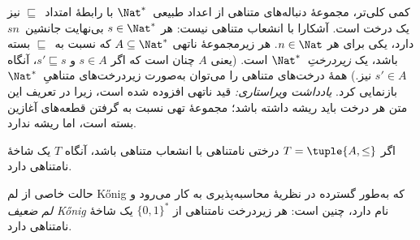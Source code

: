 \documentclass[../../../include/open-logic-section]{subfiles}
\begin{document}
\begin{ex}
کمی کلی‌تر، مجموعهٔ دنباله‌های متناهی از اعداد طبیعی~$\Nat^*$ با
رابطهٔ امتداد~$\sqsubseteq$ نیز یک درخت است. آشکارا با انشعاب متناهی
نیست: هر $s \in \Nat^*$ بی‌نهایت جانشین~$sn$ دارد، یکی برای هر
$n \in \Nat$. هر زیرمجموعهٔ ناتهی $A
\subseteq \Nat^*$ که نسبت به~$\sqsubseteq$ بسته باشد، یک
\emph{زیردرختِ}~$\Nat^*$ است. (یعنی $A$ چنان است که اگر $s \in A$
و $s' \sqsubseteq s$، آنگاه $s' \in A$ نیز.) همهٔ درخت‌های متناهی را
می‌توان به‌صورت زیردرخت‌های متناهیِ~$\Nat^*$ بازنمایی کرد.
\emph{یادداشت ویراستاری:} قید ناتهی افزوده شده است، زیرا در تعریف این متن هر درخت باید ریشه داشته باشد؛ مجموعهٔ تهی نسبت به گرفتن قطعه‌های آغازین بسته است، اما ریشه ندارد.
\end{ex}

\begin{prop}
اگر $T = \tuple{A,\le}$ درختی نامتناهی با انشعاب متناهی باشد،
آنگاه $T$ یک شاخهٔ نامتناهی دارد.
\end{prop}

حالت خاصی از لم \foreignlanguage{english}{K\H{o}nig} که به‌طور گسترده در نظریهٔ محاسبه‌پذیری به
کار می‌رود و \emph{لم ضعیف \foreignlanguage{english}{K\H{o}nig}} نام دارد، چنین است: هر زیردرخت
نامتناهی از $\{0,1\}^*$ یک شاخهٔ نامتناهی دارد.
\end{document}
